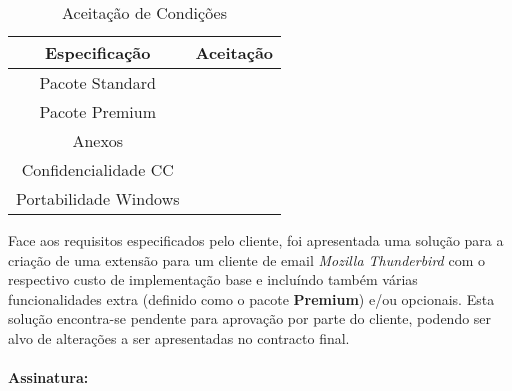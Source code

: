 \documentclass[times, 10pt,twocolumn]{article}
\begin{document}
\begin{table}[ht!]
\caption{Aceita\c{c}\~ao de Condi\c{c}\~oes} %
\centering %
\begin{tabular}{c c} %
\hline\hline %
Especifica\c{c}\~ao & Aceita\c{c}\~ao \\ [0.5ex] %
\hline %
Pacote Standard &  \\[1ex] %
Pacote Premium &  \\[1ex]
Anexos & \\[1ex] 
Confidencialidade CC & \\[1ex] 
Portabilidade Windows & \\[1ex] %
\hline %
\end{tabular}
\label{table:nonlin} %
\end{table}
Face aos requisitos especificados pelo cliente, foi apresentada uma solu\c{c}\~ao para a cria\c{c}\~ao de uma extens\~ao para um cliente de email \emph{Mozilla Thunderbird} com o respectivo custo de implementa\c{c}\~ao base e inclu\'indo tamb\'em v\'arias funcionalidades extra (definido como o pacote \textbf{Premium}) e/ou opcionais. Esta solu\c{c}\~ao encontra-se pendente para aprova\c{c}\~ao por parte do cliente, podendo ser alvo de altera\c{c}\~oes a ser apresentadas no contracto final.\\
\\
\textbf{Assinatura:}
\nocite{ex1,ex2}


\end{document}
